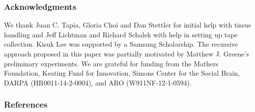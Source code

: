 \documentclass{article} %
\begin{document}
\subsubsection*{Acknowledgments}
We thank Juan C. Tapia, Gloria Choi and Dan Stettler for initial help with tissue handling and Jeff Lichtman and Richard Schalek with help in setting up tape collection. Kisuk Lee was supported by a Samsung Scholarship. The recursive approach proposed in this paper was partially motivated by Matthew J. Greene's preliminary experiments.  We are grateful for funding from the Mathers Foundation, Keating Fund for Innovation, Simons Center for the Social Brain, DARPA (HR0011-14-2-0004), and ARO (W911NF-12-1-0594).

\subsubsection*{References}
\end{document}
